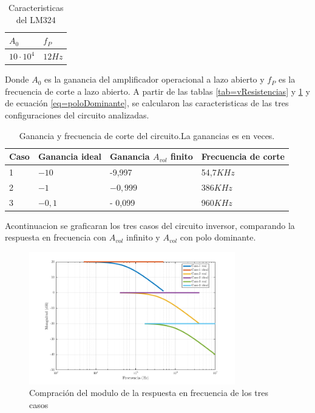 \documentclass[../../main.tex]{subfiles}
\begin{document}
\begin{table}[h]
\begin{center}
\begin{tabular}{|l|l|}
\hline
$A_{0}$ & $f_{P}$ \\
\hline \hline
$10\cdot 10^{4}$& $ 12Hz $ \\ \hline

\end{tabular}
\caption{Caracteristicas del LM324} 
\label{tab=lm324Carac}
\end{center}
\end{table}
Donde $A_{0}$ es la ganancia del amplificador operacional a lazo abierto y  $f_{P}$ es la frecuencia de corte a lazo abierto. A partir de las tablas \ref{tab=vResistencias} y \ref{tab=lm324Carac} y de ecuación  \ref{eq=poloDominante}, se calcularon las caracteristicas de las tres configuraciones del circuito analizadas.

\begin{table}[h]
\begin{center}
\begin{tabular}{|l|l|l|l|}
\hline
Caso &Ganancia ideal & Ganancia $A_{vol}$ finito & Frecuencia de corte\\
\hline \hline
1 & $-10$ & -9,997 & 54,7$KHz$ \\ \hline
2 & $-1$ &  $-0,999 $ &  386$KHz$  \\ \hline
3 & $-0,1$ &- 0,099 &960$KHz$\\ \hline
\end{tabular}
\caption{Ganancia y frecuencia de corte del circuito.La ganancias es en veces.} 
\label{tab=gananciayFrecCorte}
\end{center}
\end{table}

Acontinuacion se graficaran los tres casos del circuito inversor, comparando la respuesta en frecuencia con  $A_{vol}$ infinito y $A_{vol}$ con polo dominante.

\begin{figure}[H]
\centering
\includegraphics[width=0.8\textwidth]{real_ideal_mag_inv}
\caption{Compración del modulo de la respuesta en frecuencia de los tres casos}
\end{figure}
\end{document}
